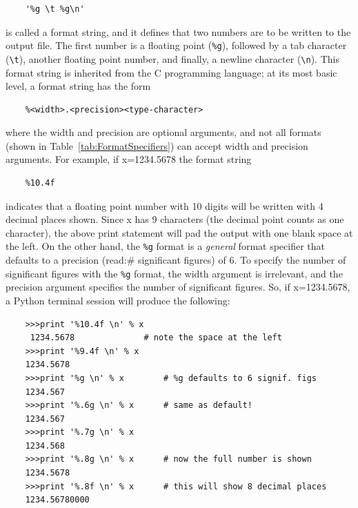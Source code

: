 \begin{verbatim}
	'%g \t %g\n'
\end{verbatim}
is called a format string, and it defines that two numbers are to be written to the output file. The first number is a floating point (\verb!%g!), followed by a tab character (\verb!\t!), another floating point number, and finally, a newline character (\verb!\n!). This format string is inherited from the C programming language; at its most basic level, a format string has the form
\begin{verbatim}
	%<width>.<precision><type-character>
\end{verbatim}
where the width and precision are optional arguments, and not all formats (shown in Table~\ref{tab:FormatSpecifiers}) can accept width and precision arguments. For example, if x=1234.5678 the format string 
\begin{verbatim}
	%10.4f
\end{verbatim}
indicates that a floating point number with 10 digits will be written with 4 decimal places shown. Since x has 9 characters (the decimal point counts as one character), the above print statement will pad the output with one blank space at the left. On the other hand, the \verb!%g! format is a \textit{general} format specifier that defaults to a precision (read:\# significant figures) of 6. To specify the number of significant figures with the \verb!%g! format, the width argument is irrelevant, and the precision argument specifies the number of significant figures. So, if x=1234.5678, a Python terminal session will produce the following:
\begin{verbatim}
	>>>print '%10.4f \n' % x 
	 1234.5678				# note the space at the left
	>>>print '%9.4f \n' % x 
	1234.5678
	>>>print '%g \n' % x 		# %g defaults to 6 signif. figs
	1234.567
	>>>print '%.6g \n' % x 		# same as default!
	1234.567
	>>>print '%.7g \n' % x 		
	1234.568
	>>>print '%.8g \n' % x 		# now the full number is shown
	1234.5678
	>>>print '%.8f \n' % x 		# this will show 8 decimal places
	1234.56780000				
\end{verbatim}


